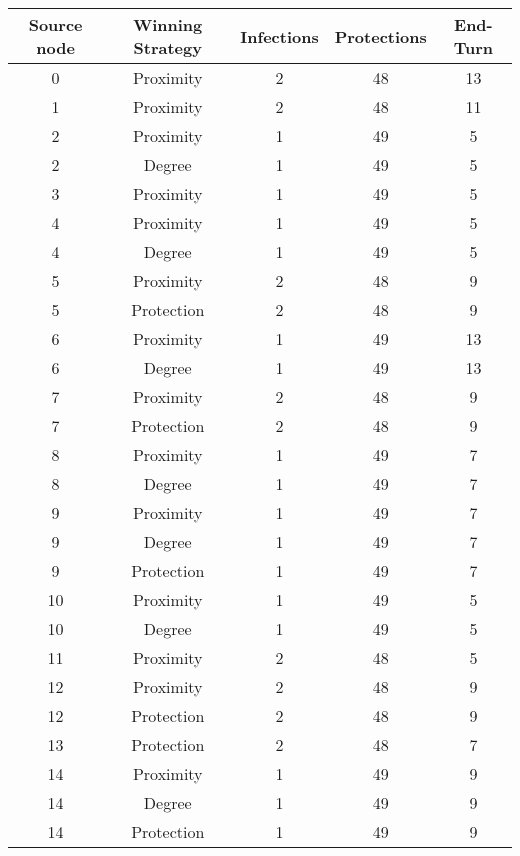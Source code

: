 \documentclass[results.tex]{subfiles}
\begin{document}
\begin{center}
  \begin{tabular}{| c || c | c | c | c |}
    \hline
    {\bfseries Source node} & {\bfseries Winning Strategy} & {\bfseries Infections} & {\bfseries Protections} & {\bfseries End-Turn} \\  %
    \hline\hline
    0 & Proximity & 2 & 48 & 13 \\ 
    \hline
    1 & Proximity & 2 & 48 & 11 \\ 
    \hline
    2 & Proximity & 1 & 49 & 5 \\ 
    \hline
    2 & Degree & 1 & 49 & 5 \\ 
    \hline
    3 & Proximity & 1 & 49 & 5 \\ 
    \hline
    4 & Proximity & 1 & 49 & 5 \\ 
    \hline
    4 & Degree & 1 & 49 & 5 \\ 
    \hline
    5 & Proximity & 2 & 48 & 9 \\ 
    \hline
    5 & Protection & 2 & 48 & 9 \\ 
    \hline
    6 & Proximity & 1 & 49 & 13 \\ 
    \hline
    6 & Degree & 1 & 49 & 13 \\ 
    \hline
    7 & Proximity & 2 & 48 & 9 \\ 
    \hline
    7 & Protection & 2 & 48 & 9 \\ 
    \hline
    8 & Proximity & 1 & 49 & 7 \\ 
    \hline
    8 & Degree & 1 & 49 & 7 \\ 
    \hline
    9 & Proximity & 1 & 49 & 7 \\ 
    \hline
    9 & Degree & 1 & 49 & 7 \\ 
    \hline
    9 & Protection & 1 & 49 & 7 \\ 
    \hline
    10 & Proximity & 1 & 49 & 5 \\ 
    \hline
    10 & Degree & 1 & 49 & 5 \\ 
    \hline
    11 & Proximity & 2 & 48 & 5 \\ 
    \hline
    12 & Proximity & 2 & 48 & 9 \\ 
    \hline
    12 & Protection & 2 & 48 & 9 \\ 
    \hline
    13 & Protection & 2 & 48 & 7 \\ 
    \hline
    14 & Proximity & 1 & 49 & 9 \\ 
    \hline
    14 & Degree & 1 & 49 & 9 \\ 
    \hline
    14 & Protection & 1 & 49 & 9 \\ 

\end{tabular}
\end{center}
\end{document}
